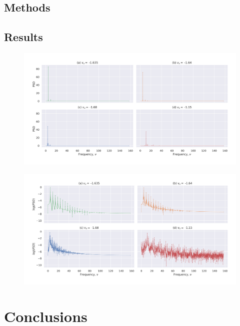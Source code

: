 \documentclass[a4paper]{article}
\begin{document}
	
		\subsection{Methods} \label{methods2}
	
		
		\subsection{Results} \label{results2}
		
		\begin{figure} [h]
			\includegraphics[width=\columnwidth]{../task2/plots/q1-5_lin.jpg}
			\caption{}
			\label{fig:task2_lin}
		\end{figure}
		
		\begin{figure} [h]
			\includegraphics[width=\columnwidth]{../task2/plots/q1-5_log.jpg}
			\caption{}
			\label{fig:task2:log}
		\end{figure}
	
	
	
	\section{Conclusions} \label{conclusions}
	
	
\end{document}
